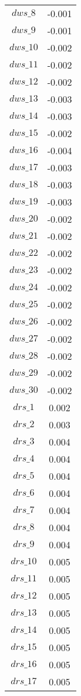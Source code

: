 \begin{center}
\begin{longtable}{cc}
$dws\_8$ 	 & 	 -0.001 \\
$dws\_9$ 	 & 	 -0.001 \\
$dws\_10$ 	 & 	 -0.002 \\
$dws\_11$ 	 & 	 -0.002 \\
$dws\_12$ 	 & 	 -0.002 \\
$dws\_13$ 	 & 	 -0.003 \\
$dws\_14$ 	 & 	 -0.003 \\
$dws\_15$ 	 & 	 -0.002 \\
$dws\_16$ 	 & 	 -0.004 \\
$dws\_17$ 	 & 	 -0.003 \\
$dws\_18$ 	 & 	 -0.003 \\
$dws\_19$ 	 & 	 -0.003 \\
$dws\_20$ 	 & 	 -0.002 \\
$dws\_21$ 	 & 	 -0.002 \\
$dws\_22$ 	 & 	 -0.002 \\
$dws\_23$ 	 & 	 -0.002 \\
$dws\_24$ 	 & 	 -0.002 \\
$dws\_25$ 	 & 	 -0.002 \\
$dws\_26$ 	 & 	 -0.002 \\
$dws\_27$ 	 & 	 -0.002 \\
$dws\_28$ 	 & 	 -0.002 \\
$dws\_29$ 	 & 	 -0.002 \\
$dws\_30$ 	 & 	 -0.002 \\
$drs\_1$ 	 & 	 0.002 \\
$drs\_2$ 	 & 	 0.003 \\
$drs\_3$ 	 & 	 0.004 \\
$drs\_4$ 	 & 	 0.004 \\
$drs\_5$ 	 & 	 0.004 \\
$drs\_6$ 	 & 	 0.004 \\
$drs\_7$ 	 & 	 0.004 \\
$drs\_8$ 	 & 	 0.004 \\
$drs\_9$ 	 & 	 0.004 \\
$drs\_10$ 	 & 	 0.005 \\
$drs\_11$ 	 & 	 0.005 \\
$drs\_12$ 	 & 	 0.005 \\
$drs\_13$ 	 & 	 0.005 \\
$drs\_14$ 	 & 	 0.005 \\
$drs\_15$ 	 & 	 0.005 \\
$drs\_16$ 	 & 	 0.005 \\
$drs\_17$ 	 & 	 0.005 \\

\end{longtable}
\end{center}
